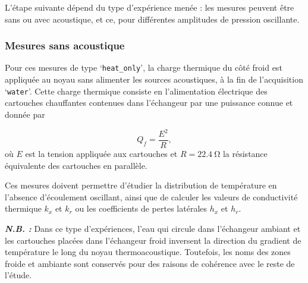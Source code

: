 L'étape suivante dépend du type d'expérience menée : les mesures peuvent être sans ou avec acoustique, et ce, pour  différentes amplitudes de pression oscillante. %

\subsubsection{Mesures sans acoustique}\label{chap:MesureSansAcou}
Pour ces mesures de type `\texttt{heat\_{}only}', la charge thermique du côté froid est appliquée au noyau sans alimenter les sources acoustiques, à la fin de l'acquisition `\texttt{water}'. Cette charge thermique consiste en l'alimentation électrique des cartouches chauffantes contenues dans l'échangeur par une puissance connue et donnée par

\begin{equation}
	Q_f = \frac{E^2}{R},
	\label{eq:Qf_définitionEsurR}
\end{equation}
où $E$ est la tension appliquée aux cartouches et $R=\qty{22.4}{\ohm}$ la résistance équivalente des cartouches en parallèle.

Ces mesures doivent permettre d'étudier la distribution de température en l'absence d'écoulement oscillant, ainsi que de calculer les valeurs de conductivité thermique $k_x$ et $k_r$ ou les coefficients de pertes latérales $h_x$ et $h_r$.\smallskip

\textbf{\textit{N.B. :}} Dans ce type d'expériences, l'eau qui circule dans l'échangeur ambiant et les cartouches placées dans l'échangeur froid inversent la direction du gradient de température le long du noyau thermoacoustique. Toutefois, les noms des zones \og froide \fg{} et \og ambiante \fg{} sont conservés pour des raisons de cohérence avec le reste de l'étude.

